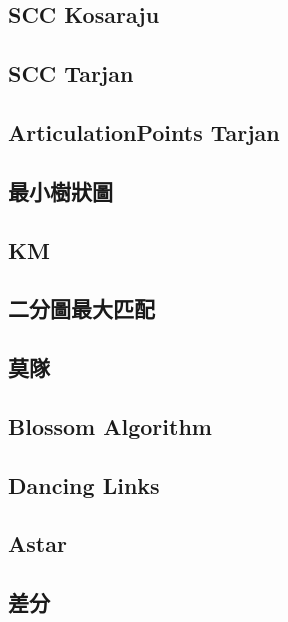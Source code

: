     \subsection{SCC Kosaraju}
         \columnbreak
    \subsection{SCC Tarjan}
         \columnbreak
    \subsection{ArticulationPoints Tarjan}
         \columnbreak
    \subsection{最小樹狀圖}
         \columnbreak
    \subsection{KM}
        
    \subsection{二分圖最大匹配}
        
    \subsection{莫隊}
         \columnbreak
    \subsection{Blossom Algorithm}
        
    \subsection{Dancing Links}
         \columnbreak
    \subsection{Astar}
        
    \subsection{差分}
         \columnbreak
